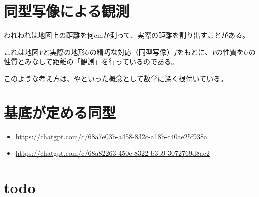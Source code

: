 \documentclass[../../../topic_linear-algebra]{subfiles}
\begin{document}
\sectionline
\section{同型写像による観測}

われわれは地図上の距離を何cmか測って、実際の距離を割り出すことがある。

これは地図$V$と実際の地形$U$の精巧な対応（同型写像）$f$をもとに、$V$の性質を$U$の性質とみなして距離の「観測」を行っているのである。

\br

このような考え方は、やといった概念として数学に深く根付いている。

\sectionline
\section{基底が定める同型}

\begin{mindflow}
  \begin{itemize}
    \item \url{https://chatgpt.com/c/68a7e03b-a458-832c-a18b-c40ae25f938a}
    \item \url{https://chatgpt.com/c/68a82263-450c-8322-b3b9-3072769d8ac2}
  \end{itemize}
\end{mindflow}

\sectionline
\section{todo}
\end{document}
